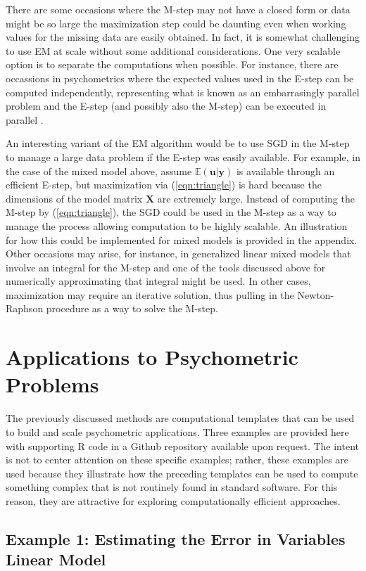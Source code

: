 \documentclass[12pt]{article}
\begin{document}
There are some occasions where the M-step may not have a closed form or data might be so large the maximization step could be daunting even when working values for the missing data are easily obtained. In fact, it is somewhat challenging to use EM at scale without some additional considerations. One very scalable option is to separate the computations when possible. For instance, there are occassions in psychometrics where the expected values used in the E-step can be computed independently, representing what is known as an embarrasingly parallel problem and the E-step (and possibly also the M-step) can be executed in parallel \cite{lee}. 

An interesting variant of the EM algorithm would be to use SGD in the M-step to manage a large data problem if the E-step was easily available. For example, in the case of the mixed model above, assume $\mathbb{E}(\bm{u}|\bm{y})$ is available through an efficient E-step, but maximization via (\ref{eqn:triangle}) is hard because the dimensions of the model matrix $\bm{X}$ are extremely large. Instead of computing the M-step by (\ref{eqn:triangle}), the SGD could be used in the M-step as a way to manage the process allowing computation to be highly scalable. An illustration for how this could be implemented  for mixed models is provided in the appendix. Other occasions may arise, for instance, in generalized linear mixed models that involve an integral for the M-step and one of the tools discussed above for numerically approximating that integral might be used. In other cases, maximization may require an iterative solution, thus pulling in the Newton-Raphson procedure as a way to solve the M-step.

\section*{Applications to Psychometric Problems}

The previously discussed methods are computational templates that can be used to build and scale psychometric applications. Three examples are provided here with supporting R code in a Github repository available upon request. The intent is not to center attention on these specific examples; rather, these examples are used because they illustrate how the preceding templates can be used to compute something complex that is not routinely found in standard software. For this reason, they are attractive for exploring computationally efficient approaches. 

\subsection*{Example 1: Estimating the Error in Variables Linear Model}
\end{document}
